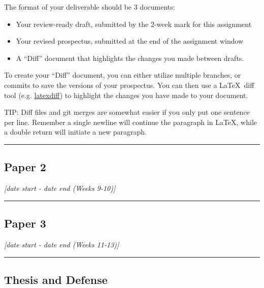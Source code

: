\documentclass[12pt]{article}
\begin{document}
The format of your deliverable should be 3 documents:
\begin{itemize}
	\item Your review-ready draft, submitted by the 2-week mark for this assignment
	\item Your revised prospectus, submitted at the end of the assignment window
	\item A ``Diff'' document that highlights the changes you made between drafts.
\end{itemize}

To create your ``Diff'' document, you can either utilize multiple branches, or commits to save the versions of your prospectus.
You can then use a \LaTeX~diff tool (e.g. \href{https://texblog.org/2018/08/14/track-changes-with-latexdiff/}{latexdiff}) to highlight the changes you have made to your document.

\bigskip

TIP: Diff files and git merges are somewhat easier if you only put one sentence per line.
Remember a single newline will continue the paragraph in \LaTeX, while a double return will initiate a new paragraph.



\vspace{1em}\hrule\vspace{1em}
\subsection{Paper 2}
\label{ssec:p2}

\textit{[date start - date end (Weeks 9-10)]}

\bigskip



\vspace{1em}\hrule\vspace{1em}
\subsection{Paper 3}
\label{ssec:p3}

\textit{[date start - date end (Weeks 11-13)]}

\bigskip



\vspace{1em}\hrule\vspace{1em}
\subsection{Thesis and Defense}
\label{sec:finalreport}
\end{document}
